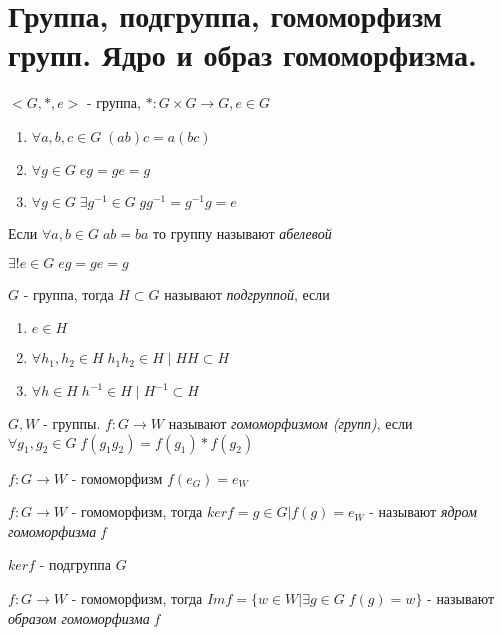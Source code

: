 \section{Группа, подгруппа, гомоморфизм групп. Ядро и образ гомоморфизма.}

\begin{defn}
   \(<G, *, e>\) - группа, 
   \(*: G \times G \rightarrow G, e \in G \) 
   \begin{enumerate}       
     \item \( \forall a, b, c \in G \; (ab)c=a(bc) \)
     \item \( \forall g \in G \; eg = ge = g \)
     \item \( \forall g \in G \; \exists g^{-1} \in G \; gg^{-1} = g^{-1}g = e \)
   \end{enumerate}
   Если \( \forall a, b \in G \; ab = ba \) то группу называют \emph{абелевой} 
\end{defn}

\begin{thm}
  \( \exists ! e \in G \; eg = ge = g \)
\end{thm}

\begin{defn}
  \( G \) - группа, тогда \( H \subset G \) называют \emph{подгруппой}, если 
  \begin{enumerate}
    \item \( e \in H \)
    \item \( \forall h_1, h_2 \in H \; h_{1}h_{2} \in H \; | \; HH \subset H \)
    \item \( \forall h \in H \; h^{-1} \in H \; | \; H^{-1} \subset H \)
  \end{enumerate}
\end{defn}

\begin{defn}
  \( G, W \) - группы. \newline
  \( f: G \rightarrow W \) называют \emph{гомоморфизмом (групп)}, если \( \forall g_1, g_2 \in G \; f(g_{1}g_2) = f(g_1) * f(g_2) \)
\end{defn}

\begin{thm}
  \( f: G \rightarrow W \) - гомоморфизм \newline
  \( f(e_G) = e_W \)
\end{thm}

\begin{defn}
    \( f: G \rightarrow W \) - гомоморфизм, тогда \newline
    \( ker f = {g \in G | f(g) = e_W} \) - называют \emph{ядром гомоморфизма f}
\end{defn}

\begin{thm}
  \( ker f \) - подгруппа \( G \)
\end{thm}

\begin{defn}
   \( f: G \rightarrow W \) - гомоморфизм, тогда \newline
   \( Im f = \{ w \in W | \exists g \in G \; f(g) = w \} \) - называют \emph{образом гомоморфизма f}
\end{defn}
